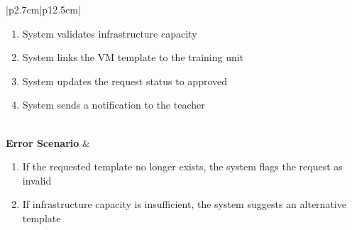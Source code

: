 \begin{table}[H]
\begin{tabular}{|p{2.7cm}|p{12.5cm}|}
\begin{minipage}[t]{\linewidth}
\begin{enumerate}[topsep=0pt,itemsep=1pt,parsep=0pt,partopsep=0pt]
                                          \item System validates infrastructure capacity
                                          \item System links the VM template to the training unit
                                          \item System updates the request status to approved
                                          \item System sends a notification to the teacher
                                      \end{enumerate}
                                  \end{minipage}            \\
        \hline
        \textbf{Error Scenario} & \begin{minipage}[t]{\linewidth}
                                      \begin{enumerate}[topsep=0pt,itemsep=1pt,parsep=0pt,partopsep=0pt]
                                          \item If the requested template no longer exists, the system flags the request as
                                                invalid
                                          \item If infrastructure capacity is insufficient, the system suggests an alternative
                                                template
                                      \end{enumerate}
                                  \end{minipage} \\
        \hline
    \end{tabular}
    \label{tab:admin-approve-vm-assignment}
\end{table}
